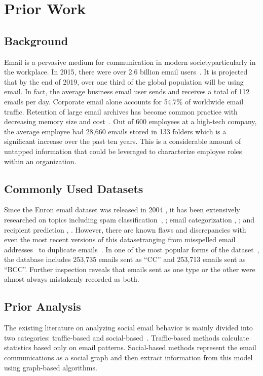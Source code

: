 \documentclass[12pt]{report}
\begin{document}
\chapter{Prior Work} \label{PriorWork}
\section{Background}
Email is a pervasive medium for communication in modern society\textemdash{}particularly in the workplace.
In 2015, there were over 2.6 billion email users~\cite{radicati_emails_2015}.
It is projected that by the end of 2019, over one third of the global population will be using email.
In fact, the average business email user sends and receives a total of 112 emails per day.
Corporate email alone accounts for 54.7\% of worldwide email traffic.
Retention of large email archives has become common practice with decreasing memory size and cost~\cite{fisher_revisiting_2006}.
Out of 600 employees at a high-tech company, the average employee had 28,660 emails stored in 133 folders which is a significant increase over the past ten years.
This is a considerable amount of untapped information that could be leveraged to characterize employee roles within an organization.
\section{Commonly Used Datasets}
Since the Enron email dataset was released in 2004 \cite{klimt_introducing_2004}, it has been extensively researched on topics including spam classification~\cite{gaber_e-mail_2016}, \cite{shams_classifying_2013}; email categorization \cite{he_novel_2014}, \cite{keila_structure_2005}; and recipient prediction \cite{sofershtein_predicting_2015}, \cite{hu_towards_2012}.
However, there are known flaws and discrepancies with even the most recent versions of this dataset\textemdash{}ranging from misspelled email addresses~\cite{nordbo_data_2014} to duplicate emails~\cite{waterman_big_2014}.
In one of the most popular forms of the dataset~\cite{shetty_enron_2004}, the database includes 253,735 emails sent as ``CC'' and  253,713 emails sent as ``BCC''.
Further inspection reveals that emails sent as one type or the other were almost always mistakenly recorded as both.
\section{Prior Analysis}
The existing literature on analyzing social email behavior is mainly divided into two categories: traffic-based and social-based~\cite{tang_email_2013}.
Traffic-based methods calculate statistics based only on email patterns.
Social-based methods represent the email communications as a social graph and then extract information from this model using graph-based algorithms.
\end{document}
